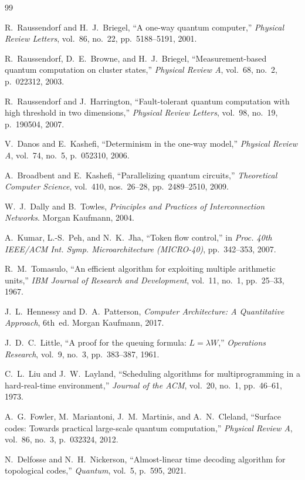 \documentclass[journal,10pt,twocolumn]{IEEEtran}
\begin{document}

\begin{thebibliography}{99}

R.~Raussendorf and H.~J.~Briegel,
``A one-way quantum computer,''
\emph{Physical Review Letters}, vol.~86, no.~22, pp.~5188--5191, 2001.

R.~Raussendorf, D.~E.~Browne, and H.~J.~Briegel,
``Measurement-based quantum computation on cluster states,''
\emph{Physical Review A}, vol.~68, no.~2, p.~022312, 2003.

R.~Raussendorf and J.~Harrington,
``Fault-tolerant quantum computation with high threshold in two dimensions,''
\emph{Physical Review Letters}, vol.~98, no.~19, p.~190504, 2007.

V.~Danos and E.~Kashefi,
``Determinism in the one-way model,''
\emph{Physical Review A}, vol.~74, no.~5, p.~052310, 2006.

A.~Broadbent and E.~Kashefi,
``Parallelizing quantum circuits,''
\emph{Theoretical Computer Science}, vol.~410, nos.~26--28,
pp.~2489--2510, 2009.

W.~J.~Dally and B.~Towles,
\emph{Principles and Practices of Interconnection Networks}.
Morgan Kaufmann, 2004.

A.~Kumar, L.-S.~Peh, and N.~K.~Jha,
``Token flow control,''
in \emph{Proc. 40th IEEE/ACM Int. Symp. Microarchitecture (MICRO-40)},
pp.~342--353, 2007.

R.~M.~Tomasulo,
``An efficient algorithm for exploiting multiple arithmetic units,''
\emph{IBM Journal of Research and Development}, vol.~11, no.~1,
pp.~25--33, 1967.

J.~L.~Hennessy and D.~A.~Patterson,
\emph{Computer Architecture: A Quantitative Approach}, 6th~ed.
Morgan Kaufmann, 2017.

J.~D.~C.~Little,
``A proof for the queuing formula: $L = \lambda W$,''
\emph{Operations Research}, vol.~9, no.~3, pp.~383--387, 1961.

C.~L.~Liu and J.~W.~Layland,
``Scheduling algorithms for multiprogramming in a hard-real-time environment,''
\emph{Journal of the ACM}, vol.~20, no.~1, pp.~46--61, 1973.

A.~G.~Fowler, M.~Mariantoni, J.~M.~Martinis, and A.~N.~Cleland,
``Surface codes: Towards practical large-scale quantum computation,''
\emph{Physical Review A}, vol.~86, no.~3, p.~032324, 2012.

N.~Delfosse and N.~H.~Nickerson,
``Almost-linear time decoding algorithm for topological codes,''
\emph{Quantum}, vol.~5, p.~595, 2021.

\end{thebibliography}
\end{document}
